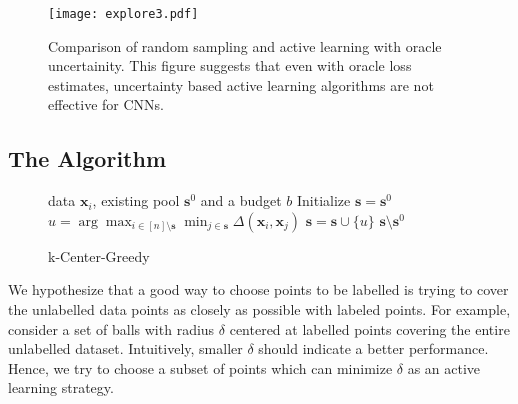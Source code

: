 \documentclass{article}
\begin{document}
\begin{figure}[t]
\vspace{-5mm}
\texttt{[image: explore3.pdf]}
\vspace{-5mm}
\caption{Comparison of random sampling and active learning with oracle uncertainity. This figure suggests that even with oracle loss estimates, uncertainty based active learning algorithms are not effective for CNNs.}
\vspace{-5mm}
\label{fig:neg}
\end{figure}

\subsection{The Algorithm}
\label{sec:alg}
  \begin{figure}
    \begin{minipage}{0.5\textwidth}
    \vspace{-8mm}
\begin{algorithm}[H]
   \caption{k-Center-Greedy}
      \label{alg:greedy}
\begin{algorithmic}
    data $\mathbf{x}_i$, existing pool $\mathbf{s}^0$ and a budget $b$
    \STATE Initialize $\mathbf{s}=\mathbf{s}^0$
   \REPEAT
   \STATE $u=\arg\max_{i \in [n] \setminus \mathbf{s}} \min_{j \in \mathbf{s}} \Delta(\mathbf{x}_i, \mathbf{x}_j)$
   \STATE $\mathbf{s} = \mathbf{s} \cup \{u\}$
    $\mathbf{s} \setminus \mathbf{s}^0$
\end{algorithmic}
\end{algorithm}
\vspace{-8mm}
    \end{minipage}
  \end{figure}

We hypothesize that a good way to choose points to be labelled is trying to cover the unlabelled data points as closely as possible with labeled points. For example, consider a set of balls with radius $\delta$ centered at labelled points covering the entire unlabelled dataset. Intuitively, smaller $\delta$ should indicate a better performance. Hence, we try to choose a subset of points which can minimize $\delta$ as an active learning strategy. 
  
\end{document}
